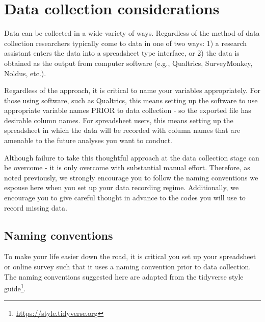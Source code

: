 \documentclass[
]{krantz}
\renewcommand{\href}[2]{#2\footnote{\url{#1}}}
\begin{document}
\hypertarget{data-collection-considerations}{%
\section{Data collection considerations}\label{data-collection-considerations}}

Data can be collected in a wide variety of ways. Regardless of the method of data collection researchers typically come to data in one of two ways: 1) a research assistant enters the data into a spreadsheet type interface, or 2) the data is obtained as the output from computer software (e.g., Qualtrics, SurveyMonkey, Noldus, etc.).

Regardless of the approach, it is critical to name your variables appropriately. For those using software, such as Qualtrics, this means setting up the software to use appropriate variable names PRIOR to data collection - so the exported file has desirable column names. For spreadsheet users, this means setting up the spreadsheet in which the data will be recorded with column names that are amenable to the future analyses you want to conduct.

Although failure to take this thoughtful approach at the data collection stage can be overcome - it is only overcome with substantial manual effort. Therefore, as noted previously, we strongly encourage you to follow the naming conventions we espouse here when you set up your data recording regime. Additionally, we encourage you to give careful thought in advance to the codes you will use to record missing data.

\hypertarget{naming-conventions}{%
\subsection{Naming conventions}\label{naming-conventions}}

To make your life easier down the road, it is critical you set up your spreadsheet or online survey such that it uses a naming convention prior to data collection. The naming conventions suggested here are adapted from the tidyverse \href{https://style.tidyverse.org}{style guide}.
\end{document}
